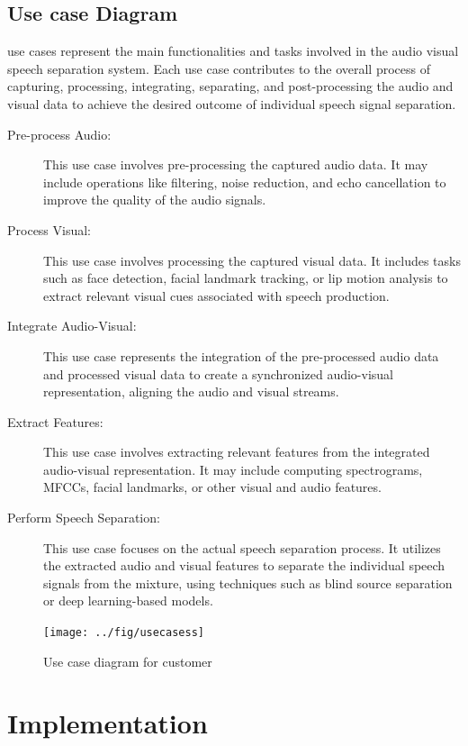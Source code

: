 \documentclass[12pt,a4paper]{report}
\begin{document}
\newpage
\section{Use case Diagram}
use cases represent the main functionalities and tasks involved in the audio visual speech separation system. Each use case contributes to the overall process of capturing, processing, integrating, separating, and post-processing the audio and visual data to achieve the desired outcome of individual speech signal separation.
\begin{description}
    \item [Pre-process Audio:] This use case involves pre-processing the captured audio data. It may include operations like filtering, noise reduction, and echo cancellation to improve the quality of the audio signals.

\item [Process Visual:] This use case involves processing the captured visual data. It includes tasks such as face detection, facial landmark tracking, or lip motion analysis to extract relevant visual cues associated with speech production.

\item [Integrate Audio-Visual:] This use case represents the integration of the pre-processed audio data and processed visual data to create a synchronized audio-visual representation, aligning the audio and visual streams.

\item [Extract Features:] This use case involves extracting relevant features from the integrated audio-visual representation. It may include computing spectrograms, MFCCs, facial landmarks, or other visual and audio features.

\item [Perform Speech Separation:] This use case focuses on the actual speech separation process. It utilizes the extracted audio and visual features to separate the individual speech signals from the mixture, using techniques such as blind source separation or deep learning-based models.

\end{description}

\begin{figure}[hbtp]
\centering
\texttt{[image: ../fig/usecasess]}
\caption{Use case diagram for customer}
\end{figure}


\chapter{Implementation}
\end{document}

